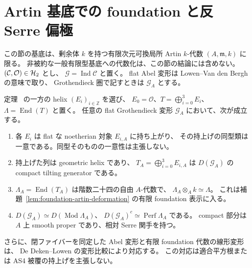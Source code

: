 \section{Artin 基底での foundation と反 Serre 偏極}
\label{sec:artin-foundation}

この節の基底は、剰余体 $k$ を持つ有限次元可換局所 Artin
$k$-代数 $(A,\mathfrak m,k)$ に限る。
非被約な一般有限型基底への代数化は、この節の結論には含めない。
$(\mathcal C,\mathcal O)\in\mathcal H_2$ とし、
$\mathcal G=\operatorname{Ind}\mathcal C$ と置く。
flat Abel 変形は Lowen--Van den Bergh の意味で取り、
Grothendieck 圏で記すときは $\mathcal G_A$ とする。

\begin{theorem}
\label{thm:artin-foundation-lift}
定理~\cite[\texttt{thm:normal-helix}]{QuadricIntrinsic2026} の一方の helix $(E_i)_{i\in\mathbb Z}$ を選び、
$E_0=\mathcal O$、$T=\bigoplus_{i=0}^{3}E_i$、
$\Lambda=\operatorname{End}(T)$ と置く。
任意の flat Grothendieck 変形 $\mathcal G_A$ において、次が成立する。
\begin{enumerate}
\item 各 $E_i$ は flat な noetherian 対象 $E_{i,A}$ に持ち上がり、
  その持上げの同型類は一意である。同型そのものの一意性は主張しない。
\item 持上げた列は geometric helix であり、
  $T_A=\bigoplus_{i=0}^{3}E_{i,A}$ は $D(\mathcal G_A)$ の compact tilting generator である。
\item $\Lambda_A=\operatorname{End}(T_A)$ は階数二十四の自由 $A$-代数で、
  $\Lambda_A\otimes_A k\simeq\Lambda$。
  これは補題~\ref{lem:foundation-artin-deformation} の有限 foundation 表示に入る。
\item $D(\mathcal G_A)\simeq D(\operatorname{Mod}\Lambda_A)$、
  $D(\mathcal G_A)^c\simeq\operatorname{Perf}\Lambda_A$ である。
  compact 部分は $A$ 上 smooth proper であり、相対 Serre 関手を持つ。
\end{enumerate}
さらに、閉ファイバーを同定した Abel 変形と有限 foundation 代数の線形変形は、
De Deken--Lowen の変形比較により対応する。
この対応は適合平方根または AS4 被覆の持上げを主張しない。
\end{theorem}

